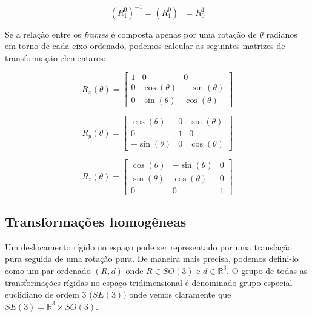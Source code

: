 \begin{equation}
    {(R_1^0)}^{-1} = {(R_1^0)}^{\top} = R_0^1
\end{equation}

Se a relação entre os \emph{frames} é composta apenas por uma rotação de
\(\theta\) radianos em torno de cada eixo ordenado, podemos calcular as
seguintes matrizes de transformação elementares:

\begin{equation}
    R_x(\theta) = \begin{bmatrix}
        1 & 0            & 0             \\
        0 & \cos(\theta) & -\sin(\theta) \\
        0 & \sin(\theta) & \cos(\theta)
    \end{bmatrix}
\end{equation}

\begin{equation}
    R_y(\theta) = \begin{bmatrix}
        \cos(\theta)  & 0 & \sin(\theta) \\
        0             & 1 & 0            \\
        -\sin(\theta) & 0 & \cos(\theta)
    \end{bmatrix}
\end{equation}

\begin{equation}
    R_z(\theta) = \begin{bmatrix}
        \cos(\theta) & -\sin(\theta) & 0 \\
        \sin(\theta) & \cos(\theta)  & 0 \\
        0            & 0             & 1
    \end{bmatrix}
\end{equation}

\subsection{Transformações homogêneas}

Um deslocamento rígido no espaço pode ser representado por uma translação pura
seguida de uma rotação pura. De maneira mais precisa, podemos defini-lo como um
par ordenado \((R, d)\) onde \(R \in SO(3)\) e \(d \in \mathbb{R}^3\). O grupo
de todas as transformações rígidas no espaço tridimensional é denominado grupo
especial euclidiano de ordem 3 (\(SE(3)\)) onde vemos claramente que \(SE(3) =
\mathbb{R}^3 \times SO(3)\).

